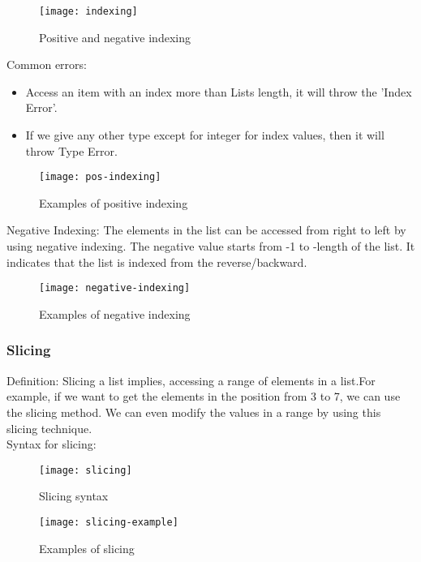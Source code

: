 \begin{figure}[h]
	\centering
	\texttt{[image: indexing]}
	\caption{Positive and negative indexing}
	\label{fig:indexing}
\end{figure}

{\large Common errors:} 
\begin{itemize}
	\item Access an item with an index more than Lists length, it will throw the 'Index Error'.
	\item If we give any other type except for integer for index values, then it will throw Type Error.
\end{itemize}

\begin{figure}[h]
	\centering
	\texttt{[image: pos-indexing]}
	\caption{Examples of positive indexing}
	\label{fig:posindex}
\end{figure}

{\large Negative Indexing: }The elements in the list can be accessed from right to left by using negative indexing. The negative value starts from -1 to -length of the list. It indicates that the list is indexed from the reverse/backward.

\begin{figure}[h]
	\centering
	\texttt{[image: negative-indexing]}
	\caption{Examples of negative indexing}
	\label{fig:negindex}
\end{figure}
\newpage
\subsubsection{Slicing}
{\large Definition:} Slicing a list implies, accessing a range of elements in a list.For example, if we want to get the elements in the position from 3 to 7, we can use the slicing method. We can even modify the values in a range by using this slicing technique. \\

{\large Syntax for slicing:}

\begin{figure}[h]
	\centering
	\texttt{[image: slicing]}
	\caption{Slicing syntax}
	\label{fig:slicing}
\end{figure}
\begin{figure}[h]
	\centering
	\texttt{[image: slicing-example]}
	\caption{Examples of slicing}
	\label{fig:sliexam}
\end{figure}

